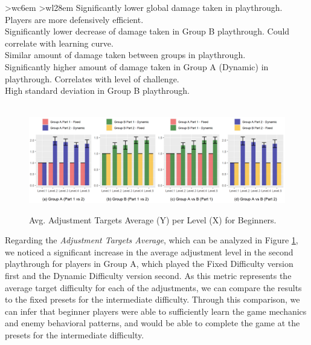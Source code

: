 \begin{table}[ht]
\begin{center}
\begin{tabular}{ >{\small}w{c}{6em} >{\footnotesize}w{l}{28em} }
        {
            \textbullet\space Significantly lower global damage taken in  playthrough. Players are more defensively efficient. \\ %
            \textbullet\space Significantly lower decrease of damage taken in Group B  playthrough. Could correlate with learning curve. \\ %
            \textbullet\space Similar amount of damage taken between groups in  playthrough. \\ %
            \textbullet\space Significantly higher amount of damage taken in Group A (Dynamic) in  playthrough. Correlates with level of challenge. \\ %
            \textbullet\space High standard deviation in Group B  playthrough. \\ %
        } \\
        \bottomrule
      \end{tabular}
    \end{center}
\end{table}

\begin{figure}[ht]
    \begin{center}
    \caption{Avg. Adjustment Targets Average (Y) per Level (X) for Beginners.}
        \includegraphics[width=\textwidth]{figures/adjustment_target_level-beginner_players.png}
        \label{fig:result-metric-beginners-adjustment-target-level}
    \end{center}
\end{figure}

Regarding the \emph{Adjustment Targets Average}, which can be analyzed in Figure \ref{fig:result-metric-beginners-adjustment-target-level}, we noticed a significant increase in the average adjustment level in the second playthrough for players in Group A, which played the Fixed Difficulty version first and the Dynamic Difficulty version second. As this metric represents the average target difficulty for each of the adjustments, we can compare the results to the fixed presets for the intermediate difficulty. Through this comparison, we can infer that beginner players were able to sufficiently learn the game mechanics and enemy behavioral patterns, and would be able to complete the game at the presets for the intermediate difficulty.

